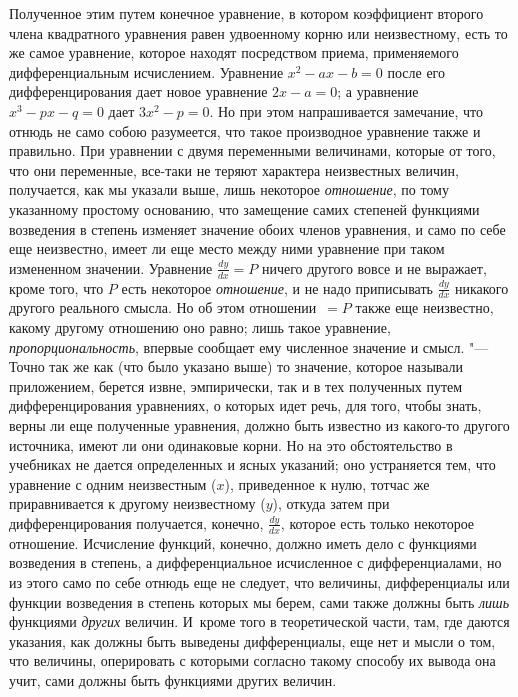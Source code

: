 Полученное этим путем конечное уравнение, в котором коэффициент второго члена
квадратного уравнения равен удвоенному корню или неизвестному, есть то же самое
уравнение, которое находят посредством приема, применяемого дифференциальным
исчислением. Уравнение $x^2-ax-b=0$ после его дифференцирования дает новое
уравнение $2x-a=0$; а уравнение $x^3-px-q=0$ дает $3x^2-p=0$. Но при этом
напрашивается замечание, что отнюдь не само собою разумеется, что такое
производное уравнение также и правильно. При уравнении с двумя переменными
величинами, которые от того, что они переменные, все-таки не теряют характера
неизвестных величин, получается, как мы указали выше, лишь некоторое
{\em отношение}, по тому указанному простому основанию, что замещение самих
степеней функциями возведения в степень изменяет значение обоих членов
уравнения, и само по себе еще неизвестно, имеет ли еще место между ними
уравнение при таком измененном значении. Уравнение $\frac{dy}{dx}=P$ ничего
другого вовсе и не выражает, кроме того, что $P$ есть некоторое
{\em отношение}, и не надо приписывать $\frac{dy}{dx}$ никакого другого
реального смысла. Но об этом отношении~$=P$ также еще неизвестно, какому
другому отношению оно равно; лишь такое уравнение, {\em пропорциональность},
впервые сообщает ему численное значение и смысл. "--- Точно так же как (что
было указано выше) то значение, которое называли приложением, берется извне,
эмпирически, так и в тех полученных путем дифференцирования уравнениях, о
которых идет речь, для того, чтобы знать, верны ли еще полученные уравнения,
должно быть известно из какого-то другого источника, имеют ли они одинаковые
корни. Но на это обстоятельство в учебниках не дается определенных и ясных
указаний; оно устраняется тем, что уравнение с одним неизвестным ($x$),
приведенное к нулю, тотчас же приравнивается к другому неизвестному ($y$),
откуда затем при дифференцирования получается, конечно, $\frac{dy}{dx}$,
которое есть только некоторое отношение. Исчисление функций, конечно, должно
иметь дело с функциями возведения в степень, а дифференциальное исчисленное с
дифференциалами, но из этого само по себе отнюдь еще не следует, что величины,
дифференциалы или функции возведения в степень которых мы берем, сами также
должны быть {\em лишь} функциями {\em других} величин. И~кроме того в
теоретической части, там, где даются указания, как должны быть выведены
дифференциалы, еще нет и мысли о том, что величины, оперировать с которыми
согласно такому способу их вывода она учит, сами должны быть функциями других
величин.

